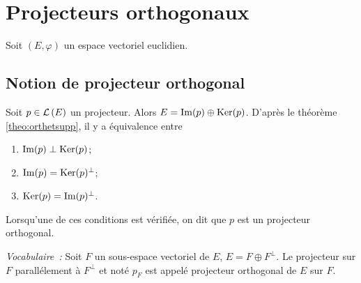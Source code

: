     \section{Projecteurs orthogonaux}

    Soit \((E, \varphi)\) un espace vectoriel euclidien.

    \subsection{Notion de projecteur orthogonal}

    Soit \(p \in \mathcal{L}\left(E\right)\) un projecteur. Alors \(E = \operatorname{Im}(p)\oplus \operatorname{Ker}(p)\). D'après le théorème~
    \ref{theo:orthetsupp}, il y a équivalence entre
    \begin{enumerate}
      \item \(\operatorname{Im}(p) \perp \operatorname{Ker}(p)\);
      \item \(\operatorname{Im}(p) = \operatorname{Ker}(p)^\perp\);
      \item \(\operatorname{Ker}(p) = \operatorname{Im}(p)^\perp\).
    \end{enumerate}
    Lorsqu'une de ces conditions est vérifiée, on dit que \(p\) est un projecteur orthogonal.

    \emph{Vocabulaire~:} Soit \(F\) un sous-espace vectoriel de \(E\), \(E = F \oplus F^\perp\). Le projecteur sur \(F\) parallélement à \(F^\perp\) et noté \(p_F\) est appelé projecteur orthogonal de \(E\) sur \(F\).

